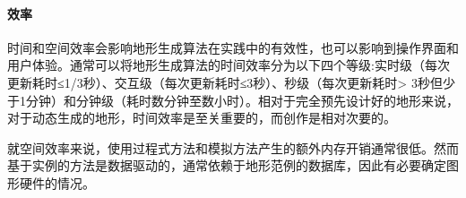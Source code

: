\paragraph{效率}
时间和空间效率会影响地形生成算法在实践中的有效性，也可以影响到操作界面和用户体验。通常可以将地形生成算法的时间效率分为以下四个等级:实时级（每次更新耗时≤1/3秒）、交互级（每次更新耗时≤3秒）、秒级（每次更新耗时> 3秒但少于1分钟）和分钟级（耗时数分钟至数小时）。相对于完全预先设计好的地形来说，对于动态生成的地形，时间效率是至关重要的，而创作是相对次要的。\par
就空间效率来说，使用过程式方法和模拟方法产生的额外内存开销通常很低。然而基于实例的方法是数据驱动的，通常依赖于地形范例的数据库，因此有必要确定图形硬件的情况。

